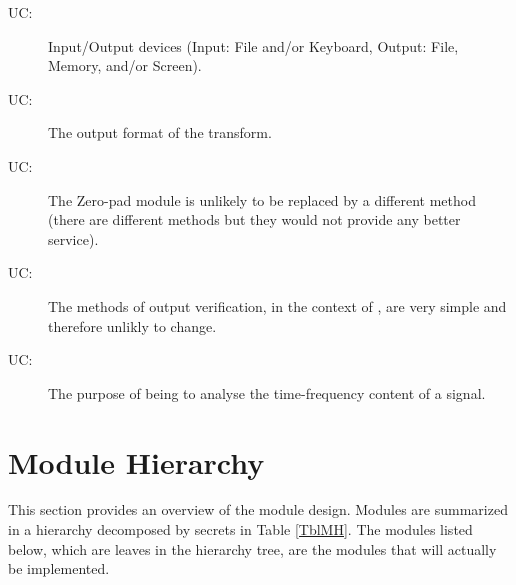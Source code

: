 \documentclass[12pt, titlepage]{article}
\newcounter{ucnum}
\newcommand{\uctheucnum}{UC\theucnum}
\begin{document}
\begin{description}
\item[ \uctheucnum \label{ucIO}:] Input/Output devices
  (Input: File and/or Keyboard, Output: File, Memory, and/or Screen).
\item[ \uctheucnum \label{ucOutputformat}:] The output format of the transform.
\item[ \uctheucnum \label{ucZeropad}:] The Zero-pad module is unlikely to be replaced by a different method (there are different methods but they would not provide any better service).
\item[ \uctheucnum \label{ucOutputVerify}:] The methods of output verification, in the context of \progname{}, are very simple and therefore unlikly to change.
\item[ \uctheucnum \label{ucGoal}:] The purpose of \progname{} being to analyse the time-frequency content of a signal.
\end{description}

\section{Module Hierarchy} \label{SecMH}

This section provides an overview of the module design. Modules are summarized
in a hierarchy decomposed by secrets in Table \ref{TblMH}. The modules listed
below, which are leaves in the hierarchy tree, are the modules that will
actually be implemented.
\end{document}
